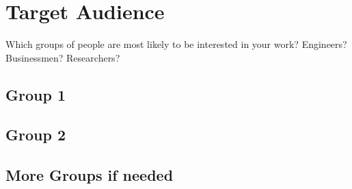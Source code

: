 \section{Target Audience}
Which groups of people are most likely to be interested in your work? Engineers? Businessmen? Researchers?
\subsection{Group 1}
\subsection{Group 2}
\subsection{More Groups if needed}